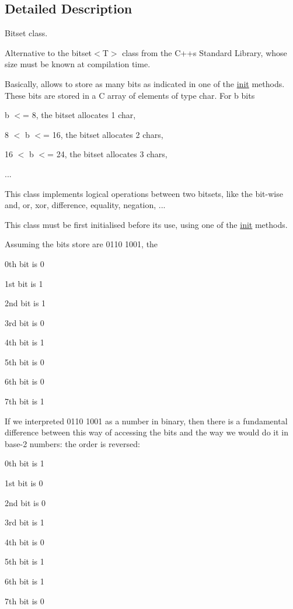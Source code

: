 \subsection{Detailed Description}
Bitset class. 

Alternative to the bitset$<$\+T$>$ class from the C++\textquotesingle{}s Standard Library, whose size must be known at compilation time.

Basically, allows to store as many bits as indicated in one of the \hyperlink{classlgraph_1_1utils_1_1static__bitset_afad1ede9e08c9d59b641150d2203edca}{init} methods. These bits are stored in a C array of elements of type \textquotesingle{}char\textquotesingle{}. For b bits
\begin{DoxyItemize}
\item b $<$= 8, the bitset allocates 1 char,
\item 8 $<$ b $<$= 16, the bitset allocates 2 chars,
\item 16 $<$ b $<$= 24, the bitset allocates 3 chars,
\item ...
\end{DoxyItemize}

This class implements logical operations between two bitsets, like the bit-\/wise and, or, xor, difference, equality, negation, ...

This class must be first initialised before its use, using one of the \hyperlink{classlgraph_1_1utils_1_1static__bitset_afad1ede9e08c9d59b641150d2203edca}{init} methods.

Assuming the bits store are 0110 1001, the
\begin{DoxyItemize}
\item 0th bit is 0
\item 1st bit is 1
\item 2nd bit is 1
\item 3rd bit is 0
\item 4th bit is 1
\item 5th bit is 0
\item 6th bit is 0
\item 7th bit is 1
\end{DoxyItemize}

If we interpreted \textquotesingle{}0110 1001\textquotesingle{} as a number in binary, then there is a fundamental difference between this way of accessing the bits and the way we would do it in base-\/2 numbers\+: the order is reversed\+:
\begin{DoxyItemize}
\item 0th bit is 1
\item 1st bit is 0
\item 2nd bit is 0
\item 3rd bit is 1
\item 4th bit is 0
\item 5th bit is 1
\item 6th bit is 1
\item 7th bit is 0
\end{DoxyItemize}

